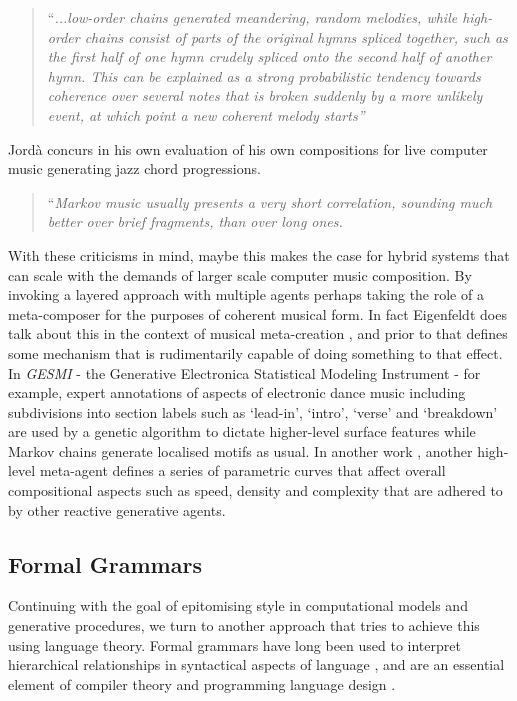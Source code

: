 \blockcquote[]{Roads1996}{``\textit{...low-order chains generated meandering, random melodies, while high-order chains consist of parts of the original hymns spliced together, such as the first half of one hymn crudely spliced onto the second half of another hymn. This can be explained as a strong probabilistic tendency towards coherence over several notes that is broken suddenly by a more unlikely event, at which point a new coherent melody starts''}}

Jordà concurs in his own evaluation of his own compositions for live computer music generating jazz chord progressions. 

\blockcquote[]{Jorda1991}{``\textit{Markov music usually presents a very short correlation, sounding much better over brief fragments, than over long ones.}}

With these criticisms in mind, maybe this makes the case for hybrid systems that can scale with the demands of larger scale computer music composition. By invoking a layered approach with multiple agents perhaps taking the role of a meta-composer for the purposes of coherent musical form. In fact Eigenfeldt does talk about this in the context of musical meta-creation \citep{Eigenfeldt2016}, and prior to that defines some mechanism that is rudimentarily capable of doing something to that effect. In \textit{GESMI} - the Generative Electronica Statistical Modeling Instrument \citep{Eigenfeldt2013} - for example, expert annotations of aspects of electronic dance music including subdivisions into section labels such as `lead-in', `intro', `verse' and `breakdown' are used by a genetic algorithm to dictate higher-level surface features while Markov chains generate localised motifs as usual. In another work \citep{Eigenfeldt2016a}, another high-level meta-agent defines a series of parametric curves that affect overall compositional aspects such as speed, density and complexity that are adhered to by other reactive generative agents.

\subsection{Formal Grammars}

Continuing with the goal of epitomising style in computational models and generative procedures, we turn to another approach that tries to achieve this using language theory. Formal grammars have long been used to interpret hierarchical relationships in syntactical aspects of language \citep{Chomsky1957}, and are an essential element of compiler theory and programming language design \citep{garshol2003bnf, wirth1996compiler}.

